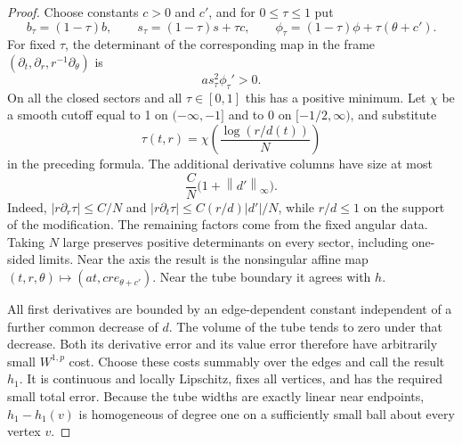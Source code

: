 \documentclass[11pt]{article}
\numberwithin{equation}{section}
\theoremstyle{definition}
\theoremstyle{remark}
\begin{document}
\begin{proof}
Choose constants $c>0$ and $c'$, and for $0\le\tau\le1$ put
\[
 b_\tau=(1-\tau)b,\qquad
 s_\tau=(1-\tau)s+\tau c,\qquad
 \phi_\tau=(1-\tau)\phi+\tau(\theta+c').
\]
For fixed $\tau$, the determinant of the corresponding map in the
frame $(\partial_t,\partial_r,r^{-1}\partial_\theta)$ is
\begin{equation}
 \label{sm:edge-determinant}
 a s_\tau^2\phi_\tau'>0.
\end{equation}
On all the closed sectors and all $\tau\in[0,1]$ this has a
positive minimum.  Let $\chi$ be a smooth cutoff equal to 1 on
$(-\infty,-1]$ and to 0 on $[-1/2,\infty)$, and substitute
\[
 \tau(t,r)=\chi\!\left(\frac{\log(r/d(t))}{N}\right)
\]
in the preceding formula.  The additional derivative columns have
size at most
\begin{equation}
 \label{sm:edge-cutoff-error}
 \frac{C}{N}\bigl(1+\left\lVert d'\right\rVert_\infty\bigr).
\end{equation}
Indeed, $|r\partial_r\tau|\le C/N$ and
$|r\partial_t\tau|\le C(r/d)|d'|/N$, while $r/d\le1$ on
the support of the modification.  The remaining factors come from
the fixed angular data.  Taking $N$ large preserves positive
determinants on every sector, including one-sided limits.
Near the axis the result is the nonsingular affine map
$(t,r,\theta)\mapsto(at,cr e_{\theta+c'})$.
Near the tube boundary it agrees with $h$.

All first derivatives are bounded by an edge-dependent constant
independent of a further common decrease of $d$.  The volume of the
tube tends to zero under that decrease.  Both its derivative error
and its value error therefore have arbitrarily small $W^{1,p}$
cost.  Choose these costs summably over the edges and call the
result $h_1$.  It is continuous and locally Lipschitz, fixes all
vertices, and has the required small total error.  Because the
tube widths are exactly linear near endpoints, $h_1-h_1(v)$ is
homogeneous of degree one on a sufficiently small ball about every
vertex $v$.


\end{proof}
\end{document}
